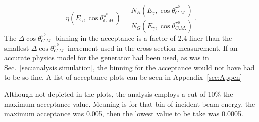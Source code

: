 \begin{equation}\label{eq:acceptance}
\eta(E_\gamma,\cos\theta^{\pi^0}_{C.M.}) = \frac{N_R(E_\gamma,\cos\theta^{\pi^0}_{C.M.})}{N_G(E_\gamma,\cos\theta^{\pi^0}_{C.M.})} \ .
\end{equation}
The $\Delta\cos\theta^{\pi^0}_{C.M.}$ binning in the acceptance is a factor of 2.4 finer than the smallest $\Delta\cos\theta^{\pi^0}_{C.M.}$ increment used in the cross-section measurement. If an accurate physics model for the generator had been used, as was in Sec.~\ref{sec:analysis.simulation}, the binning for the acceptance  would not have had to be so fine.
A list of acceptance plots can be seen in Appendix~\ref{sec:Appen} 

Although not depicted in the plots, the analysis employs a cut of 10\% the maximum acceptance value. Meaning is for that bin of incident beam energy, the maximum acceptance was 0.005, then the lowest value to be take was 0.0005.
